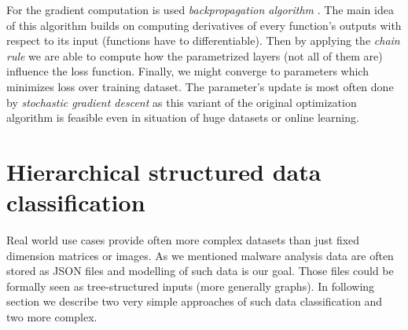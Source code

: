 For the gradient computation is used \emph{backpropagation algorithm} \cite{Rumelhart1988}. The main idea of this algorithm builds on computing derivatives of every function's outputs with respect to its input (functions have to differentiable). Then by applying the \emph{chain rule} we are able to compute how the parametrized layers (not all of them are) influence the loss function. Finally, we might converge to parameters which minimizes loss over training dataset. The parameter's update is most often done by \emph{stochastic gradient descent} \cite{Kiefer1952} as this variant of the original optimization algorithm is feasible even in situation of huge datasets or online learning.







\section{Hierarchical structured data classification}
Real world use cases provide often more complex datasets than just fixed dimension matrices or images. As we mentioned malware analysis data are often stored as JSON files and modelling of such data is our goal. Those files could be formally seen as tree-structured inputs (more generally graphs). In following section we describe two very simple approaches of such data classification and two more complex.

